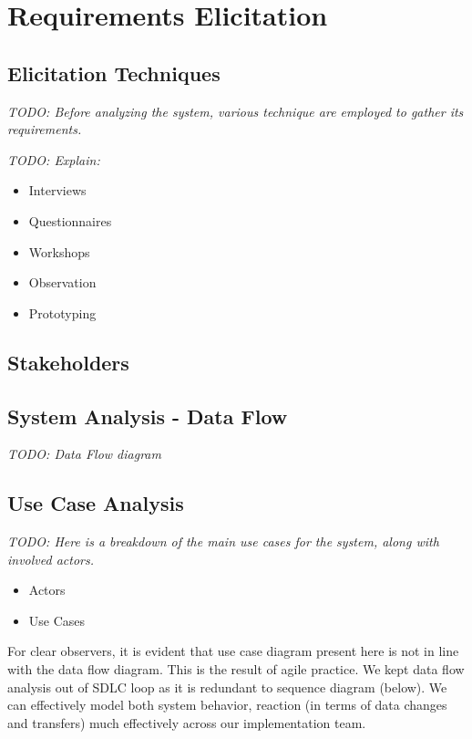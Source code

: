 %
%
\chapter{Requirements Elicitation}

\section{Elicitation Techniques}

\textit{TODO: Before analyzing the system, various technique are employed to gather its requirements.}

\textit{TODO: Explain:}

\begin{itemize}
	\item Interviews
	\item Questionnaires
	\item Workshops
	\item Observation
	\item Prototyping
\end{itemize}

\section{Stakeholders}

\section{System Analysis - Data Flow}

\textit{TODO: Data Flow diagram}

\section{Use Case Analysis}

\textit{TODO: Here is a breakdown of the main use cases for the system, along with involved actors.}

\begin{itemize}
	\item Actors
	\item Use Cases
\end{itemize}

For clear observers, it is evident that use case diagram present here is not in line with the data flow diagram. This is the result of agile practice. We kept data flow analysis out of SDLC loop as it is redundant to sequence diagram (below). We can effectively model both system behavior, reaction (in terms of data changes and transfers) much effectively across our implementation team.

